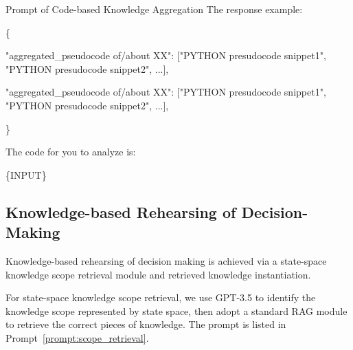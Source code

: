 \begin{gbox}{Prompt of Code-based Knowledge Aggregation}
The response example:

\{

\hspace{5mm} "aggregated\_pseudocode of/about XX": ["PYTHON presudocode snippet1", "PYTHON presudocode snippet2", ...],
    
\hspace{5mm} "aggregated\_pseudocode of/about XX": ["PYTHON presudocode snippet1", "PYTHON presudocode snippet2", ...],

\}

The code for you to analyze is: 

\hspace{10mm} \{INPUT\}

\end{gbox}

\subsection{Knowledge-based Rehearsing of Decision-Making}
\label{app:rehearsing}

Knowledge-based rehearsing of decision making is achieved via a state-space knowledge scope retrieval module and retrieved knowledge instantiation. 

For state-space knowledge scope retrieval, we use GPT-3.5 to identify the knowledge scope represented by state space, then adopt a standard RAG module to retrieve the correct pieces of knowledge. The prompt is listed in Prompt~\ref{prompt:scope_retrieval}.



